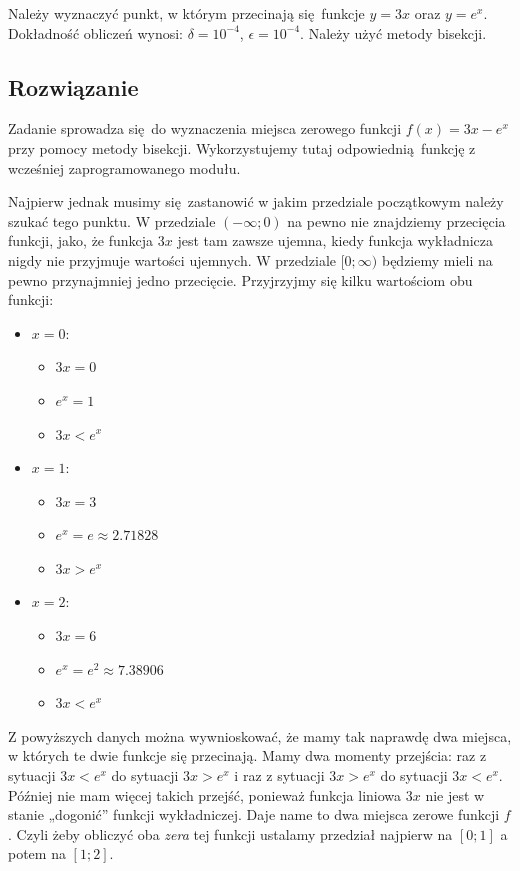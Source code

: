 \documentclass[10pt]{article}
\begin{document}
Należy wyznaczyć punkt, w którym przecinają się funkcje $y = 3x$ oraz $y = e^x$. Dokładność obliczeń wynosi: $\delta = 10^{-4}$, $\epsilon = 10^{-4}$. Należy użyć metody bisekcji.

\subsection{Rozwiązanie}

Zadanie sprowadza się do wyznaczenia miejsca zerowego funkcji $f(x) = 3x - e^x$ przy pomocy metody bisekcji. Wykorzystujemy tutaj odpowiednią funkcję z wcześniej zaprogramowanego modułu.

Najpierw jednak musimy się zastanowić w jakim przedziale początkowym należy szukać tego punktu. W przedziale $(-\infty; 0)$ na pewno nie znajdziemy przecięcia funkcji, jako, że funkcja $3x$ jest tam zawsze ujemna, kiedy funkcja wykładnicza nigdy nie przyjmuje wartości ujemnych. W przedziale $[0; \infty)$ będziemy mieli na pewno przynajmniej jedno przecięcie. Przyjrzyjmy się kilku wartościom obu funkcji:
\begin{itemize}
    \item $x = 0$:
    \begin{itemize}
        \item $3x = 0$
        \item $e^x = 1$
        \item $3x < e^x$
    \end{itemize}
    \item $x = 1$:
    \begin{itemize}
        \item $3x = 3$
        \item $e^x = e \approx 2.71828$
        \item $3x > e^x$
    \end{itemize}
    \item $x = 2$:
    \begin{itemize}
        \item $3x = 6$
        \item $e^x = e^2 \approx 7.38906$
        \item $3x < e^x$
    \end{itemize}
\end{itemize}

Z powyższych danych można wywnioskować, że mamy tak naprawdę dwa miejsca, w których te dwie funkcje się przecinają. Mamy dwa momenty przejścia: raz z sytuacji $3x < e^x$ do sytuacji $3x > e^x$ i raz z sytuacji $3x > e^x$ do sytuacji $3x < e^x$. Później nie mam więcej takich przejść, ponieważ funkcja liniowa $3x$ nie jest w stanie „dogonić” funkcji wykładniczej. Daje name to dwa miejsca zerowe funkcji $f$. Czyli żeby obliczyć oba \textit{zera} tej funkcji ustalamy przedział najpierw na $[0; 1]$ a potem na $[1;2]$.
\end{document}
